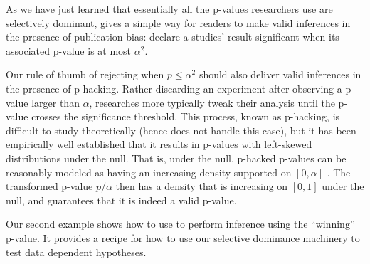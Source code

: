 \documentclass{article}
\begin{document}
As we have just learned that essentially all the p-values researchers use are selectively dominant,  gives a simple way for readers to make valid inferences in the presence of publication bias: declare a studies' result significant when its associated p-value is at most $\alpha^2$.

Our rule of thumb of rejecting when $p \leq \alpha^2$ should also deliver valid inferences in the presence of p-hacking. Rather discarding an experiment after observing a p-value larger than $\alpha$, researches more typically tweak their analysis until the p-value crosses the significance threshold. This process, known as p-hacking, is difficult to study theoretically (hence \cite{Hung2020} does not handle this case), but it has been  empirically well established that it results in p-values with left-skewed distributions under the null. That is, under the null, p-hacked p-values can be reasonably modeled as having an increasing density supported on $[0,\alpha]$ \citep{Simonsohn, Hung2020}. The transformed p-value $p/\alpha$ then has a density that is increasing on $[0, 1]$ under the null, and  guarantees that it is indeed a valid p-value.

Our second example shows how to use  to perform inference using the ``winning'' p-value. It provides a recipe for how to use our selective dominance machinery to test data dependent hypotheses. 
\end{document}
